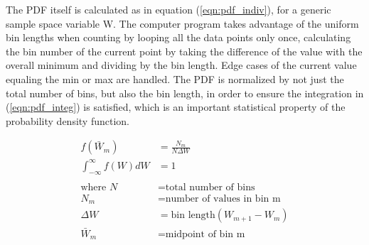 \documentclass[conf]{new-aiaa}
\begin{document}
The PDF itself is calculated as in equation (\ref{eqn:pdf_indiv}), for a generic sample space variable W.  The computer program takes advantage of the uniform bin lengths when counting by looping all the data points only once, calculating the bin number of the current point by taking the difference of the value with the overall minimum and dividing by the bin length.  Edge cases of the current value equaling the min or max are handled.  The PDF is normalized by not just the total number of bins, but also the bin length, in order to ensure the integration in (\ref{eqn:pdf_integ}) is satisfied, which is an important statistical property of the probability density function.



\begin{align} 
	f(\bar{W}_m) &= \frac{N_m}{N \Delta W} \label{eqn:pdf_indiv}\\ 
	\int_{-\infty}^{\infty} f(W)dW &= 1 \label{eqn:pdf_integ}\\ \nonumber\\
	\text{where\ \ \ \ }
	N &= \text{total number of bins} \nonumber \\
	N_m &= \text{number of values in bin m} \nonumber \\ 
	\Delta W &= \text{bin length} (W_{m+1} - W_m) \nonumber \\
	\bar{W}_m &= \text{midpoint of bin m} \nonumber
\end{align}
\end{document}
